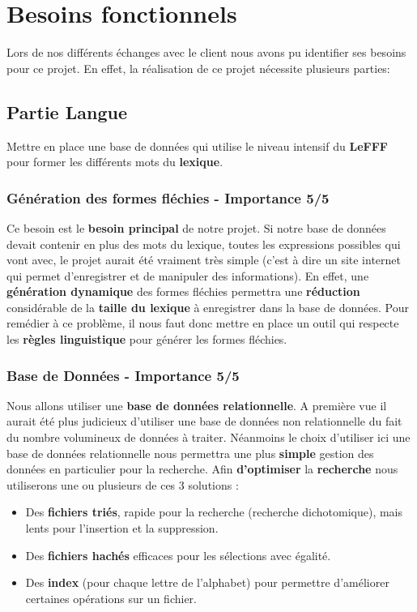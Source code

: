 \section{Besoins fonctionnels}
Lors de nos différents échanges avec le client nous avons pu identifier ses besoins pour ce projet. En effet, la réalisation de ce projet nécessite plusieurs parties:

\subsection{Partie Langue}
Mettre en place une base de données qui utilise le niveau intensif du \textbf{LeFFF} pour former les différents mots du \textbf{lexique}.

\subsubsection{Génération des formes fléchies - Importance 5/5}
Ce besoin est le \textbf{besoin principal} de notre projet. Si notre base de données devait contenir en plus des mots du lexique, toutes les expressions possibles qui vont avec, le projet aurait été vraiment très simple (c'est à dire un site internet qui permet d'enregistrer et de manipuler des informations). En effet, une \textbf{génération dynamique} des formes fléchies permettra une \textbf{réduction} considérable de la \textbf{taille du lexique} à enregistrer dans la base de données. Pour remédier à ce problème, il nous faut donc mettre en place un outil qui respecte les \textbf{règles linguistique} pour générer les formes fléchies.

\subsubsection{Base de Données - Importance 5/5}


{Nous allons utiliser une \textbf{base de données relationnelle}. A première vue il aurait été plus judicieux d'utiliser une base de données non relationnelle du fait du nombre volumineux de données à traiter. Néanmoins le choix d'utiliser ici une base de données relationnelle nous permettra une plus \textbf{simple} gestion des données en particulier pour la recherche. Afin \textbf{d'optimiser} la \textbf{recherche} nous utiliserons une ou plusieurs de ces 3 solutions : 
\begin{itemize}
\item Des \textbf{fichiers triés}, rapide pour la recherche (recherche dichotomique), mais lents pour l'insertion et la suppression.
\item Des \textbf{fichiers hachés} efficaces pour les sélections avec égalité.
\item Des \textbf{index} (pour chaque lettre de l'alphabet) pour permettre d'améliorer certaines opérations sur un fichier.
\end{itemize}\par}

